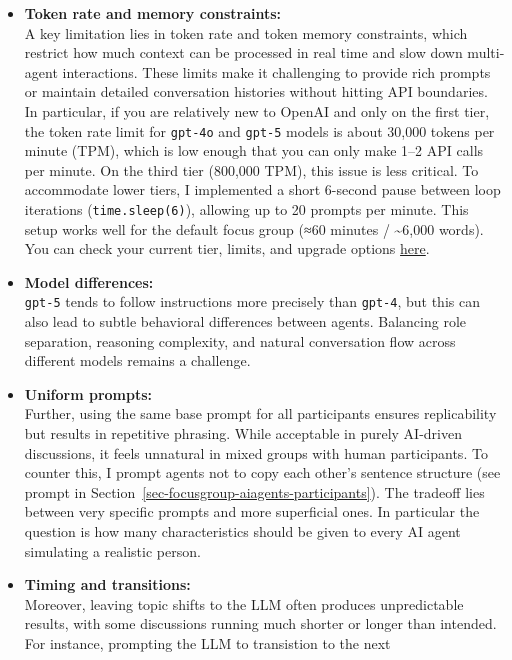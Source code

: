 \documentclass[
  letterpaper,
  DIV=11,
  numbers=noendperiod]{scrartcl}
\begin{document}
\begin{itemize}
\item
  \textbf{Token rate and memory constraints:}\\
  A key limitation lies in token rate and token memory constraints,
  which restrict how much context can be processed in real time and slow
  down multi-agent interactions. These limits make it challenging to
  provide rich prompts or maintain detailed conversation histories
  without hitting API boundaries. In particular, if you are relatively
  new to OpenAI and only on the first tier, the token rate limit for
  \texttt{gpt-4o} and \texttt{gpt-5} models is about 30,000 tokens per
  minute (TPM), which is low enough that you can only make 1--2 API
  calls per minute. On the third tier (800,000 TPM), this issue is less
  critical. To accommodate lower tiers, I implemented a short 6-second
  pause between loop iterations (\texttt{time.sleep(6)}), allowing up to
  20 prompts per minute. This setup works well for the default focus
  group (≈60 minutes / \textasciitilde6,000 words). You can check your
  current tier, limits, and upgrade options
  \href{https://platform.openai.com/settings/organization/limits}{here}.
\item
  \textbf{Model differences:}\\
  \texttt{gpt-5} tends to follow instructions more precisely than
  \texttt{gpt-4}, but this can also lead to subtle behavioral
  differences between agents. Balancing role separation, reasoning
  complexity, and natural conversation flow across different models
  remains a challenge.
\item
  \textbf{Uniform prompts:}\\
  Further, using the same base prompt for all participants ensures
  replicability but results in repetitive phrasing. While acceptable in
  purely AI-driven discussions, it feels unnatural in mixed groups with
  human participants. To counter this, I prompt agents not to copy each
  other's sentence structure (see prompt in
  Section~\ref{sec-focusgroup-aiagents-participants}). The tradeoff lies
  between very specific prompts and more superficial ones. In particular
  the question is how many characteristics should be given to every AI
  agent simulating a realistic person.
\item
  \textbf{Timing and transitions:}\\
  Moreover, leaving topic shifts to the LLM often produces unpredictable
  results, with some discussions running much shorter or longer than
  intended. For instance, prompting the LLM to transistion to the next

\end{itemize}
\end{document}
